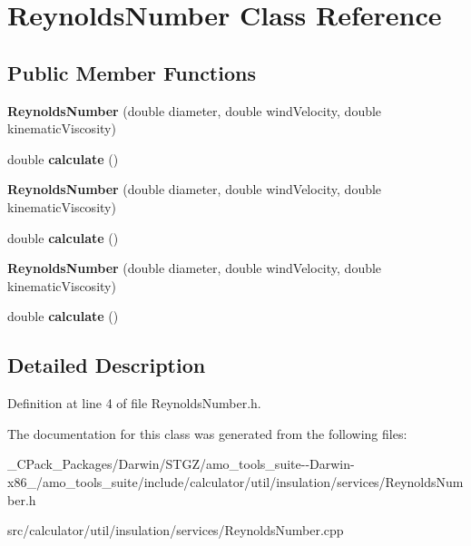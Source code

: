 \hypertarget{class_reynolds_number}{}\section{Reynolds\+Number Class Reference}
\label{class_reynolds_number}
\subsection*{Public Member Functions}
\begin{DoxyCompactItemize}
\item 
\mbox{\label{class_reynolds_number_a263fee23653c13dd404ec02998515ae7}} 
{\bfseries Reynolds\+Number} (double diameter, double wind\+Velocity, double kinematic\+Viscosity)
\item 
\mbox{\label{class_reynolds_number_aaf00f619c15683586adedad7496ba11b}} 
double {\bfseries calculate} ()
\item 
\mbox{\label{class_reynolds_number_a263fee23653c13dd404ec02998515ae7}} 
{\bfseries Reynolds\+Number} (double diameter, double wind\+Velocity, double kinematic\+Viscosity)
\item 
\mbox{\label{class_reynolds_number_aaf00f619c15683586adedad7496ba11b}} 
double {\bfseries calculate} ()
\item 
\mbox{\label{class_reynolds_number_a263fee23653c13dd404ec02998515ae7}} 
{\bfseries Reynolds\+Number} (double diameter, double wind\+Velocity, double kinematic\+Viscosity)
\item 
\mbox{\label{class_reynolds_number_aaf00f619c15683586adedad7496ba11b}} 
double {\bfseries calculate} ()
\end{DoxyCompactItemize}


\subsection{Detailed Description}


Definition at line 4 of file Reynolds\+Number.\+h.



The documentation for this class was generated from the following files\+:\begin{DoxyCompactItemize}
\item 
\+\_\+\+C\+Pack\+\_\+\+Packages/\+Darwin/\+S\+T\+G\+Z/amo\+\_\+tools\+\_\+suite-\/-\/\+Darwin-\/x86\+\_/amo\+\_\+tools\+\_\+suite/include/calculator/util/insulation/services/Reynolds\+Number.\+h\item 
src/calculator/util/insulation/services/Reynolds\+Number.\+cpp\end{DoxyCompactItemize}
